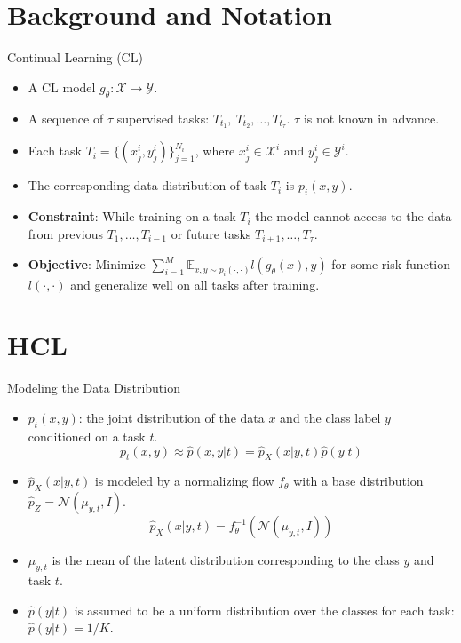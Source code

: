 \documentclass{beamer}
\begin{document}
\section{Background and Notation}
\begin{frame}{Continual Learning (CL)}
  \begin{itemize}
    \item <1-> A CL model $g_\theta : \mathcal{X} \rightarrow \mathcal{Y}$.
    \item <1-> A sequence of $\tau$ supervised tasks: $T_{t_1}, \ T_{t_2}, \dots, T_{t_\tau}$. $\tau$ is not known in advance.
    \item <1-> Each task $T_i = \{ (x_j^i, y_j^i) \}_{j = 1}^{N_i}$, where $x_j^i \in \mathcal{X}^i$ and $y_j^i \in \mathcal{Y}^i$.
    \item <1-> The corresponding data distribution of task $T_i$ is $p_i(x, y)$.
    \item <1-> \textbf{Constraint}: While training on a task $T_i$ the model cannot access to the data from previous $T_1, \dots, T_{i-1}$ or future tasks $T_{i+1}, \dots, T_{\tau}$.
    \item <1-> \textbf{Objective}: Minimize $\sum_{i = 1}^M \mathbb{E}_{x, y \sim p_i(\cdot, \cdot)}l(g_\theta(x), y)$ for some risk function $l(\cdot, \cdot)$ and generalize well on all tasks after training.
  \end{itemize} 
\end{frame}

\section{HCL}
\begin{frame}{Modeling the Data Distribution}
  \begin{itemize}
    \item <1-> $p_t(x, y)$: the joint distribution of the data $x$ and the class label $y$ conditioned on a task $t$.
    \[
      p_t(x, y) \approx \hat{p}(x, y | t) = \hat{p}_X(x | y, t) \hat{p}(y | t)
    \]
    \item <1-> $\hat{p}_X(x | y, t)$ is modeled by a normalizing flow $f_\theta$ with a base distribution $\hat{p}_Z = \mathcal{N}(\mu_{y, t}, I)$.
    \[
      \hat{p}_X(x | y, t) = f_\theta^{-1}\left( \mathcal{N}(\mu_{y, t}, I) \right)
    \]
    \item <1-> $\mu_{y, t}$ is the mean of the latent distribution corresponding to the class $y$ and task $t$.
    \item <1-> $\hat{p}(y | t)$ is assumed to be a uniform distribution over the classes for each task: $\hat{p}(y | t) = 1/K$.
  \end{itemize}
\end{frame}
\end{document}
